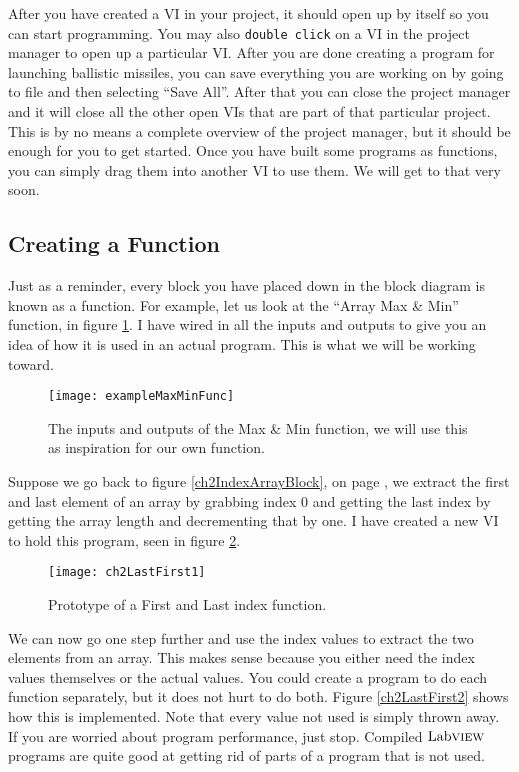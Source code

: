 After you have created a VI in your project, it should open up by itself so you can start programming. You may also \texttt{double click} on a VI in the project manager to open up a particular VI. After you are done creating a program for launching ballistic missiles, you can save everything you are working on by going to file and then selecting ``Save All''. After that you can close the project manager and it will close all the other open VIs that are part of that particular project.\\

This is by no means a complete overview of the project manager, but it should be enough for you to get started. Once you have built some programs as functions, you can simply drag them into another VI to use them. We will get to that very soon.\\

\subsection{Creating a Function}
Just as a reminder, every block you have placed down in the block diagram is known as a function. For example, let us look at the ``Array Max \& Min'' function, in figure \ref{exampleMaxMinFunc}. I have wired in all the inputs and outputs to give you an idea of how it is used in an actual program. This is what we will be working toward.\\
\begin{figure}
	\centering
	\texttt{[image: exampleMaxMinFunc]}
	\caption{The inputs and outputs of the Max \& Min function, we will use this as inspiration for our own function.}
	\label{exampleMaxMinFunc}
\end{figure}

Suppose we go back to figure \ref{ch2IndexArrayBlock}, on page \pageref{ch2IndexArrayBlock}, we extract the first and last element of an array by grabbing index $0$ and getting the last index by getting the array length and decrementing that by one. I have created a new VI to hold this program, seen in figure \ref{ch2LastFirst1}.\\
\begin{figure}
	\centering
	\texttt{[image: ch2LastFirst1]}
	\caption{Prototype of a First and Last index function.}
	\label{ch2LastFirst1}
\end{figure}

We can now go one step further and use the index values to extract the two elements from an array. This makes sense because you either need the index values themselves or the actual values. You could create a program to do each function separately, but it does not hurt to do both. Figure \ref{ch2LastFirst2} shows how this is implemented. Note that every value not used is simply thrown away. If you are worried about program performance, just stop. Compiled $\text{Lab}\textsc{view}$ programs are quite good at getting rid of parts of a program that is not used.\\

